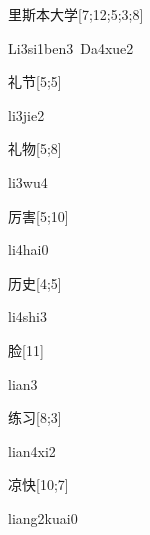 \begin{verbete}{里斯本大学}[7;12;5;3;8]
\begin{pronuncia}[\\]{Li3si1ben3\ Da4xue2}
\end{pronuncia}
\end{verbete}

\begin{verbete}[li3jie2]{礼节}[5;5]
\begin{pronuncia}{li3jie2}
\end{pronuncia}
\end{verbete}

\begin{verbete}[li3wu4]{礼物}[5;8]
\begin{pronuncia}{li3wu4}
\end{pronuncia}
\end{verbete}

\begin{verbete}[li4hai0]{厉害}[5;10]
\begin{pronuncia}{li4hai0}
\end{pronuncia}
\end{verbete}

\begin{verbete}[li4shi3]{历史}[4;5]
\begin{pronuncia}{li4shi3}
\end{pronuncia}
\end{verbete}

\begin{verbete}[lian3]{脸}[11]
\begin{pronuncia}{lian3}
\end{pronuncia}
\end{verbete}

\begin{verbete}[lian4xi2]{练习}[8;3]
\begin{pronuncia}{lian4xi2}
\end{pronuncia}
\end{verbete}

\begin{verbete}{凉快}[10;7]
\begin{pronuncia}{liang2kuai0}
\end{pronuncia}
\end{verbete}

